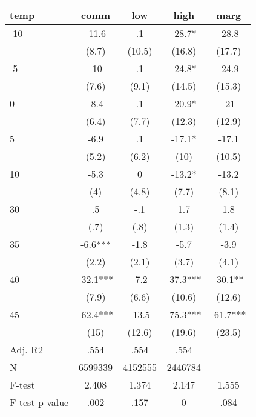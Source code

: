 \documentclass[]{article}
\begin{document}
\begin{tabular}{lcccc} \hline
temp & comm & low & high & marg \\ \hline
-10 & -11.6 & .1 & -28.7* & -28.8 \\
 & (8.7) & (10.5) & (16.8) & (17.7) \\
-5 & -10 & .1 & -24.8* & -24.9 \\
 & (7.6) & (9.1) & (14.5) & (15.3) \\
0 & -8.4 & .1 & -20.9* & -21 \\
 & (6.4) & (7.7) & (12.3) & (12.9) \\
5 & -6.9 & .1 & -17.1* & -17.1 \\
 & (5.2) & (6.2) & (10) & (10.5) \\
10 & -5.3 & 0 & -13.2* & -13.2 \\
 & (4) & (4.8) & (7.7) & (8.1) \\
30 & .5 & -.1 & 1.7 & 1.8 \\
 & (.7) & (.8) & (1.3) & (1.4) \\
35 & -6.6*** & -1.8 & -5.7 & -3.9 \\
 & (2.2) & (2.1) & (3.7) & (4.1) \\
40 & -32.1*** & -7.2 & -37.3*** & -30.1** \\
 & (7.9) & (6.6) & (10.6) & (12.6) \\
45 & -62.4*** & -13.5 & -75.3*** & -61.7*** \\
 & (15) & (12.6) & (19.6) & (23.5) \\
\hline Adj. R2 & .554 & .554 & .554 &  \\
N & 6599339 & 4152555 & 2446784 &  \\
F-test & 2.408 & 1.374 & 2.147 & 1.555 \\
 F-test p-value & .002 & .157 & 0 & .084 \\ \hline
\end{tabular}
\end{document}

